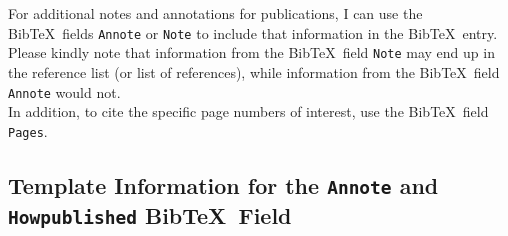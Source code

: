 \documentclass[letter,12pt]{article}
\begin{document}
For additional notes and annotations for publications, I can use the {\sc Bib}\TeX\ fields {\tt Annote} or {\tt Note} to include that information in the {\sc Bib}\TeX\ entry. Please kindly note that information from the {\sc Bib}\TeX\ field {\tt Note} may end up in the reference list (or list of references), while information from the {\sc Bib}\TeX\ field {\tt Annote} would not. \\

In addition, to cite the specific page numbers of interest, use the {\sc Bib}\TeX\ field {\tt Pages}.









\subsection{Template Information for the {\tt Annote} and {\tt Howpublished} {\sc Bib}\TeX\ Field}
\label{ssec:TemplateInformationForTheAnnoteBibTeXField}
\end{document}
